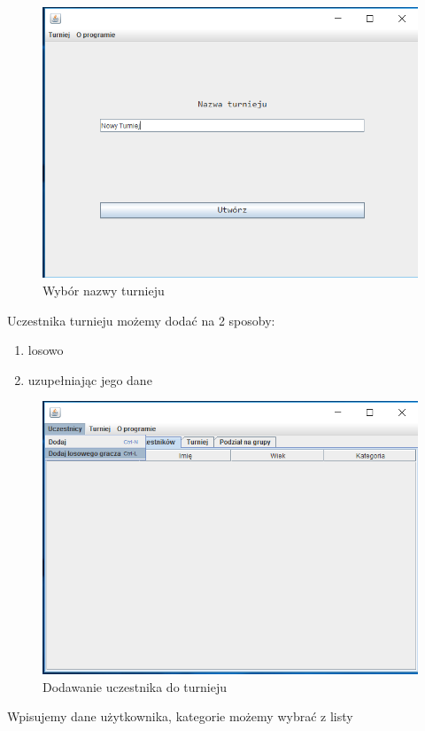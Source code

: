 \begin{figure}[H]
	\centering
	\includegraphics[width=15cm]{fig/3}
	\caption{Wybór nazwy turnieju}
	\label {fig:wybor_nazwy_turnieju} 
\end{figure}
Uczestnika turnieju możemy dodać na 2 sposoby:
\begin{enumerate}
	\item losowo
	\item uzupełniając jego dane
\end{enumerate}
\begin{figure}[H]
	\centering
	\includegraphics[width=15cm]{fig/4}
	\caption{Dodawanie uczestnika do turnieju}
	\label {fig:dodawanie_uczestnika_do_turnieju} 
\end{figure}
Wpisujemy dane użytkownika, kategorie możemy wybrać z listy
